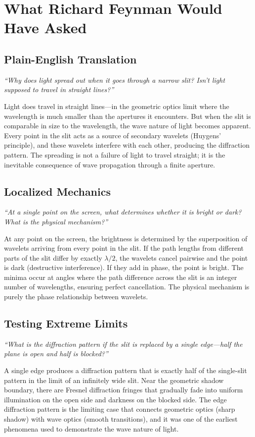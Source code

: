 \documentclass[11pt,openright]{book}
\begin{document}
\section*{What Richard Feynman Would Have Asked}

\subsection*{Plain-English Translation}
\textit{``Why does light spread out when it goes through a narrow slit? Isn't light supposed to travel in straight lines?''}

Light does travel in straight lines---in the geometric optics limit where the wavelength is much smaller than the apertures it encounters. But when the slit is comparable in size to the wavelength, the wave nature of light becomes apparent. Every point in the slit acts as a source of secondary wavelets (Huygens' principle), and these wavelets interfere with each other, producing the diffraction pattern. The spreading is not a failure of light to travel straight; it is the inevitable consequence of wave propagation through a finite aperture.

\subsection*{Localized Mechanics}
\textit{``At a single point on the screen, what determines whether it is bright or dark? What is the physical mechanism?''}

At any point on the screen, the brightness is determined by the superposition of wavelets arriving from every point in the slit. If the path lengths from different parts of the slit differ by exactly $\lambda/2$, the wavelets cancel pairwise and the point is dark (destructive interference). If they add in phase, the point is bright. The minima occur at angles where the path difference across the slit is an integer number of wavelengths, ensuring perfect cancellation. The physical mechanism is purely the phase relationship between wavelets.

\subsection*{Testing Extreme Limits}
\textit{``What is the diffraction pattern if the slit is replaced by a single edge---half the plane is open and half is blocked?''}

A single edge produces a diffraction pattern that is exactly half of the single-slit pattern in the limit of an infinitely wide slit. Near the geometric shadow boundary, there are Fresnel diffraction fringes that gradually fade into uniform illumination on the open side and darkness on the blocked side. The edge diffraction pattern is the limiting case that connects geometric optics (sharp shadow) with wave optics (smooth transitions), and it was one of the earliest phenomena used to demonstrate the wave nature of light.
\end{document}
